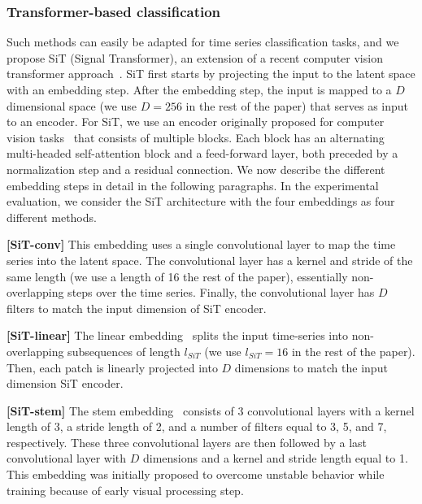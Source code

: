 \vspace{-0.2cm}
\subsubsection{Transformer-based classification}

 Such methods can easily be adapted for time series classification tasks, and  we propose SiT (Signal Transformer), an extension of a recent computer vision transformer approach~\cite{dosovitskiy2020image}. SiT first starts by projecting the input to the latent space with an embedding step. After the embedding step, the input is mapped to a $D$ dimensional space (we use $D=256$ in the rest of the paper) that serves as input to an encoder. For SiT, we use an encoder originally proposed for computer vision tasks~\cite{vaswani2017attention} that consists of multiple blocks. Each block has an alternating multi-headed self-attention block and a feed-forward layer, both preceded by a normalization step and a residual connection. We now describe the different embedding steps in detail in the following paragraphs. In the experimental evaluation, we consider the SiT architecture with the four embeddings as four different methods.

\noindent\textbf{[SiT-conv]}
This embedding uses a single convolutional layer to map the time series into the latent space. The convolutional layer has a kernel and stride of the same length (we use a length of 16  the rest of the paper), essentially  non-overlapping steps over the time series. Finally, the convolutional layer has $D$ filters to match the input dimension of  SiT encoder.

\noindent\textbf{[SiT-linear]}
The linear embedding~\cite{dosovitskiy2020image} splits the input time-series into non-overlapping subsequences of length $l_{SiT}$ (we use $l_{SiT}=16$ in the rest of the paper). Then, each patch is linearly projected into $D$ dimensions to match the input dimension  SiT encoder.

\noindent\textbf{[SiT-stem]}
The stem embedding~\cite{xiao2021early} consists of 3 convolutional layers with a kernel length of 3, a stride length of 2, and a number of filters equal to 3, 5, and 7, respectively. These three convolutional layers are then followed by a last convolutional layer with $D$ dimensions and a kernel and stride length equal to 1. This embedding was initially proposed to overcome unstable behavior while training because of  early visual processing step. 

